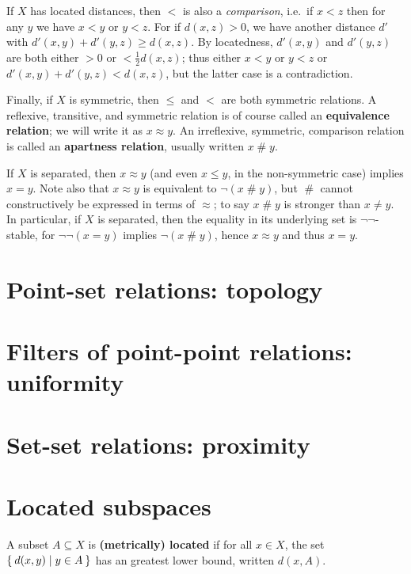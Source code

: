 \documentclass{article}
\def\apart{\mathrel{\#}}
\begin{document}
If $X$ has located distances, then $<$ is also a \emph{comparison}, i.e.\ if $x<z$ then for any $y$ we have $x<y$ or $y<z$.
For if $d(x,z)>0$, we have another distance $d'$ with $d'(x,y)+d'(y,z)\ge d(x,z)$.
By locatedness, $d'(x,y)$ and $d'(y,z)$ are both either $>0$ or $<\frac12 d(x,z)$; thus either $x<y$ or $y<z$ or $d'(x,y)+d'(y,z) < d(x,z)$, but the latter case is a contradiction.

Finally, if $X$ is symmetric, then $\le$ and $<$ are both symmetric relations.
A reflexive, transitive, and symmetric relation is of course called an \textbf{equivalence relation}; we will write it as $x\approx y$.
An irreflexive, symmetric, comparison relation is called an \textbf{apartness relation}, usually written $x\apart y$.

If $X$ is separated, then $x\approx y$ (and even $x\le y$, in the non-symmetric case) implies $x=y$.
Note also that $x\approx y$ is equivalent to $\neg(x\apart y)$, but $\apart$ cannot constructively be expressed in terms of $\approx$; to say $x\apart y$ is stronger than $x\neq y$.
In particular, if $X$ is separated, then the equality in its underlying set is $\neg\neg$-stable, for $\neg\neg(x=y)$ implies $\neg(x\apart y)$, hence $x\approx y$ and thus $x=y$.

\section{Point-set relations: topology}
\label{sec:point-set}
\label{sec:topology}


\section{Filters of point-point relations: uniformity}
\label{sec:uniformity}


\section{Set-set relations: proximity}
\label{sec:set-set}
\label{sec:proximity}




\section{Located subspaces}
\label{sec:located}

\begin{defn}
  A subset $A\subseteq X$ is \textbf{(metrically) located} if for all $x\in X$, the set $\Set{ d(x,y) | y\in A }$ has an greatest lower bound, written $d(x,A)$.
\end{defn}
\end{document}
